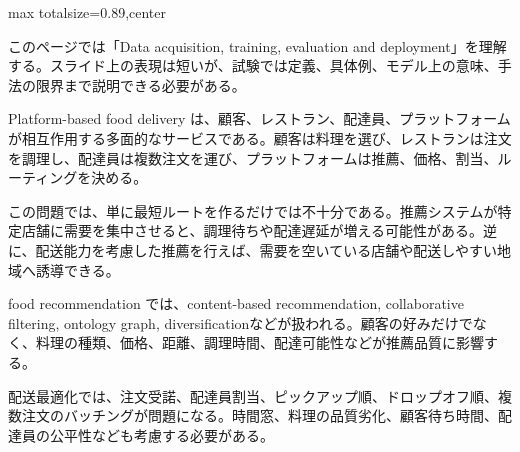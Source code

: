 \begin{minipage}[t]{0.58\textwidth}
\begin{adjustbox}{max totalsize={\textwidth}{0.89\textheight},center}
\begin{minipage}{\textwidth}\scriptsize
{}このページでは「Data acquisition, training, evaluation and deployment」を理解する。スライド上の表現は短いが、試験では定義、具体例、モデル上の意味、手法の限界まで説明できる必要がある。\par
Platform-based food delivery は、顧客、レストラン、配達員、プラットフォームが相互作用する多面的なサービスである。顧客は料理を選び、レストランは注文を調理し、配達員は複数注文を運び、プラットフォームは推薦、価格、割当、ルーティングを決める。\par
この問題では、単に最短ルートを作るだけでは不十分である。推薦システムが特定店舗に需要を集中させると、調理待ちや配達遅延が増える可能性がある。逆に、配送能力を考慮した推薦を行えば、需要を空いている店舗や配送しやすい地域へ誘導できる。\par
food recommendation では、content-based recommendation, collaborative filtering, ontology graph, diversificationなどが扱われる。顧客の好みだけでなく、料理の種類、価格、距離、調理時間、配達可能性などが推薦品質に影響する。\par
配送最適化では、注文受諾、配達員割当、ピックアップ順、ドロップオフ順、複数注文のバッチングが問題になる。時間窓、料理の品質劣化、顧客待ち時間、配達員の公平性なども考慮する必要がある。\par

\end{minipage}
\end{adjustbox}
\end{minipage}
